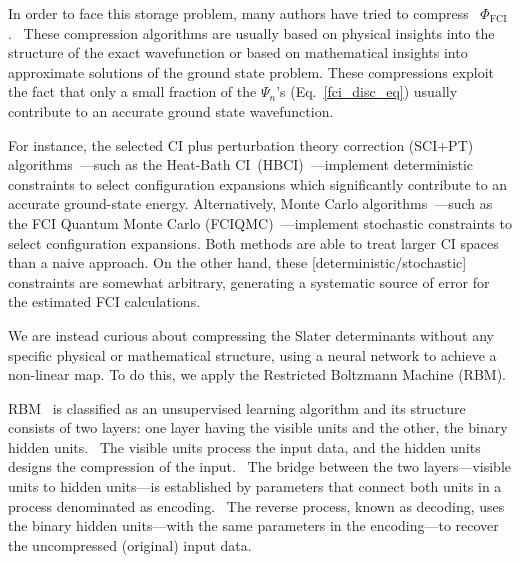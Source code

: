 \documentclass[%
 amsmath,amssymb,
 aps,prl, %
 reprint,%
]{revtex4-1}
\begin{document}
\indent In order to face this storage problem, many authors have tried to compress ~$\Phi_{\text{FCI}}$.~\cite{Bauschlicher1989,Taylor2013,McClean2015,Knowles2015,Marti2010,Buenker1974,Zhang2016,Bytautas2004,Bytautas2005,Zimmerman2017,Bytautas2011,Alcoba2014,Alcoba2016,Huron1973,Evangelisti1983,Harrison1991,Roth2009,Holmes2016,Tubman2016,Schriber2017,Booth2009,Cleland2010,Booth2014,Petruzielo2012,Ten-no2013,Greer1995,Tong2000,Coe2012,Kelly2014,Holmes2016a,Ohtsuka2017} These compression algorithms are usually based on physical insights into the structure of the exact wavefunction or based on mathematical insights into approximate solutions of the ground state problem. These compressions exploit the fact that only a small fraction of the $\Psi_{n}$'s (Eq.~\ref{fci_disc_eq}) usually contribute to an accurate ground state wavefunction.~\cite{Ivanic2001,Bytautas2009}

\indent For instance, the selected CI plus perturbation theory correction (SCI+PT) algorithms~\cite{Huron1973,Evangelisti1983,Harrison1991,Roth2009,Holmes2016,Tubman2016,Schriber2017}---such as the Heat-Bath CI~(HBCI)~\cite{Holmes2016}---implement deterministic constraints to select configuration expansions which significantly contribute to an accurate ground-state energy. Alternatively, Monte Carlo algorithms~\cite{Booth2009,Cleland2010,Booth2014,Petruzielo2012,Ten-no2013,Greer1995,Tong2000,Coe2012,Kelly2014,Holmes2016a,Ohtsuka2017}---such as the FCI Quantum Monte Carlo (FCIQMC)~\cite{Booth2009,Cleland2010,Booth2014}---implement stochastic constraints to select configuration expansions. Both methods are able to treat larger CI spaces than a naive approach. On the other hand, these [deterministic/stochastic] constraints are somewhat arbitrary, generating a systematic source of error for the estimated FCI calculations.~\cite{Azar2015,Zimmerman2017}

\indent We are instead curious about compressing the Slater determinants without any specific physical or mathematical structure, using a neural network to achieve a non-linear map. To do this, we apply the Restricted Boltzmann Machine (RBM). 

\indent RBM~\cite{Smolensky1986,Freund1992,Hinton2012,Hinton2006,Chen2017,LeRoux2008,Montufar2011,Carleo2017} is classified as an unsupervised learning algorithm and its structure consists of two layers: one layer having the visible units and the other, the binary hidden units.~\cite{Smolensky1986,Freund1992,Hinton2012,Hinton2006,Chen2017,LeRoux2008,Montufar2011} The visible units process the input data, and the hidden units designs the compression of the input.~\cite{Smolensky1986,Freund1992,Hinton2012,Hinton2006,Chen2017,LeRoux2008,Montufar2011} The bridge between the two layers---visible units to hidden units---is established by parameters that connect both units in a process denominated as encoding.~\cite{Smolensky1986,Freund1992,Hinton2012,Hinton2006,Bengio2012,Kingma2013,Chen2017,LeRoux2008,Montufar2011} The reverse process, known as decoding, uses the binary hidden units---with the same parameters in the encoding---to recover the uncompressed (original) input data.~\cite{Smolensky1986,Freund1992,Hinton2012,Hinton2006,Bengio2012,Kingma2013,Chen2017,LeRoux2008,Montufar2011}
\end{document}
